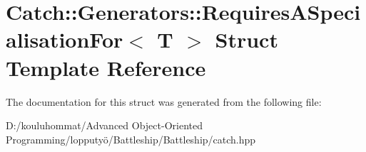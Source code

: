 \hypertarget{struct_catch_1_1_generators_1_1_requires_a_specialisation_for}{}\section{Catch\+:\+:Generators\+:\+:Requires\+A\+Specialisation\+For$<$ T $>$ Struct Template Reference}
\label{struct_catch_1_1_generators_1_1_requires_a_specialisation_for}


The documentation for this struct was generated from the following file\+:\begin{DoxyCompactItemize}
\item 
D\+:/kouluhommat/\+Advanced Object-\/\+Oriented Programming/lopputyö/\+Battleship/\+Battleship/catch.\+hpp\end{DoxyCompactItemize}
